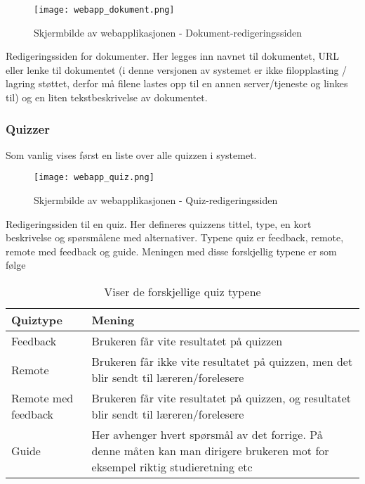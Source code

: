 \documentclass[../main.tex]{subfiles}
\begin{document}
\begin{figure}[H]
  \centering
  \texttt{[image: webapp\_dokument.png]}
  \caption{Skjermbilde av webapplikasjonen - Dokument-redigeringssiden}
\end{figure}

Redigeringssiden for dokumenter. Her legges inn navnet til dokumentet, URL eller lenke til dokumentet (i denne versjonen av systemet er ikke filopplasting / lagring støttet, derfor må filene lastes opp til en annen server/tjeneste og linkes til) og en liten tekstbeskrivelse av dokumentet.

\newpage

\subsubsection{Quizzer}

Som vanlig vises først en liste over alle quizzen i systemet.

\begin{figure}[H]
  \centering
  \texttt{[image: webapp\_quiz.png]}
  \caption{Skjermbilde av webapplikasjonen - Quiz-redigeringssiden}
\end{figure}

Redigeringssiden til en quiz. Her defineres quizzens tittel, type, en kort beskrivelse og spørsmålene med alternativer. Typene quiz er feedback, remote, remote med feedback og guide. Meningen med disse forskjellig typene er som følge

\begin{table}[H]
\begin{center}
\caption{Viser de forskjellige quiz typene}
  \begin{tabular}{ | p{5cm} | p{8cm} |}
    \hline
    Quiztype & Mening \\ \hline
    Feedback & Brukeren får vite resultatet på quizzen \\ \hline
    Remote & Brukeren får ikke vite resultatet på quizzen, men det blir sendt til læreren/forelesere \\ \hline
    Remote med feedback & Brukeren får vite resultatet på quizzen, og resultatet blir sendt til læreren/forelesere \\ \hline
    Guide & Her avhenger hvert spørsmål av det forrige. På denne måten kan man dirigere brukeren mot for eksempel riktig studieretning etc \\
    \hline
  \end{tabular}
\end{center}
\end{table}
\end{document}
